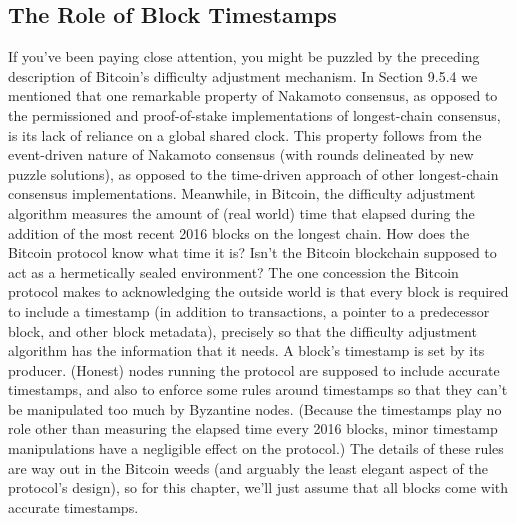 \subsection{The Role of Block Timestamps}
If you’ve been paying close attention, you might be puzzled by the preceding description of
Bitcoin’s difficulty adjustment mechanism. In Section 9.5.4 we mentioned that one remarkable
property of Nakamoto consensus, as opposed to the permissioned and proof-of-stake implementations of longest-chain consensus, is its lack of reliance on a global shared clock. This
property follows from the event-driven nature of Nakamoto consensus (with rounds delineated by new puzzle solutions), as opposed to the time-driven approach of other longest-chain
consensus implementations.
Meanwhile, in Bitcoin, the difficulty adjustment algorithm measures the amount of (real world) time that elapsed during the addition of the most recent 2016 blocks on the longest
chain. How does the Bitcoin protocol know what time it is? Isn’t the Bitcoin blockchain
supposed to act as a hermetically sealed environment?
The one concession the Bitcoin protocol makes to acknowledging the outside world is
that every block is required to include a timestamp (in addition to transactions, a pointer to
a predecessor block, and other block metadata), precisely so that the difficulty adjustment
algorithm has the information that it needs. A block’s timestamp is set by its producer.
(Honest) nodes running the protocol are supposed to include accurate timestamps, and also
to enforce some rules around timestamps so that they can’t be manipulated too much by
Byzantine nodes. (Because the timestamps play no role other than measuring the elapsed
time every 2016 blocks, minor timestamp manipulations have a negligible effect on the protocol.) The details of these rules are way out in the Bitcoin weeds (and arguably the least
elegant aspect of the protocol’s design), so for this chapter, we’ll just assume that all blocks
come with accurate timestamps. 
